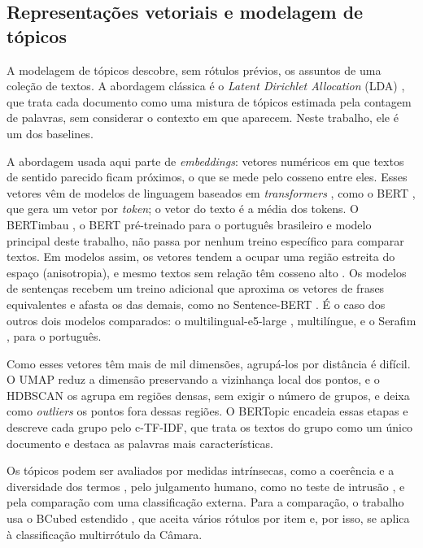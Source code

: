 \documentclass[12pt]{article}
\begin{document}
\subsection{Representações vetoriais e modelagem de tópicos}
\label{subsec:teoria-nlp}

A modelagem de tópicos descobre, sem rótulos prévios, os assuntos de uma coleção de textos. A abordagem clássica é o \textit{Latent Dirichlet Allocation} (LDA) \citep{blei2003latent}, que trata cada documento como uma mistura de tópicos estimada pela contagem de palavras, sem considerar o contexto em que aparecem. Neste trabalho, ele é um dos baselines.

A abordagem usada aqui parte de \textit{embeddings}: vetores numéricos em que textos de sentido parecido ficam próximos, o que se mede pelo cosseno entre eles. Esses vetores vêm de modelos de linguagem baseados em \textit{transformers} \citep{vaswani2017attention}, como o BERT \citep{devlin2019bert}, que gera um vetor por \textit{token}; o vetor do texto é a média dos tokens. O BERTimbau \citep{souza2020bertimbau}, o BERT pré-treinado para o português brasileiro e modelo principal deste trabalho, não passa por nenhum treino específico para comparar textos. Em modelos assim, os vetores tendem a ocupar uma região estreita do espaço (anisotropia), e mesmo textos sem relação têm cosseno alto \citep{ethayarajh2019contextual}. Os modelos de sentenças recebem um treino adicional que aproxima os vetores de frases equivalentes e afasta os das demais, como no Sentence-BERT \citep{reimers2019sentence}. É o caso dos outros dois modelos comparados: o multilingual-e5-large \citep{wang2024multilingual}, multilíngue, e o Serafim \citep{gomes2024serafim}, para o português.

Como esses vetores têm mais de mil dimensões, agrupá-los por distância é difícil. O UMAP \citep{mcinnes2018umap} reduz a dimensão preservando a vizinhança local dos pontos, e o HDBSCAN \citep{campello2013hdbscan} os agrupa em regiões densas, sem exigir o número de grupos, e deixa como \textit{outliers} os pontos fora dessas regiões. O BERTopic \citep{grootendorst2022bertopic} encadeia essas etapas e descreve cada grupo pelo c-TF-IDF, que trata os textos do grupo como um único documento e destaca as palavras mais características.

Os tópicos podem ser avaliados por medidas intrínsecas, como a coerência \citep{lau2014machine} e a diversidade dos termos \citep{dieng2020topic}, pelo julgamento humano, como no teste de intrusão \citep{chang2009reading}, e pela comparação com uma classificação externa. Para a comparação, o trabalho usa o BCubed estendido \citep{amigo2009comparison}, que aceita vários rótulos por item e, por isso, se aplica à classificação multirrótulo da Câmara.
\end{document}
